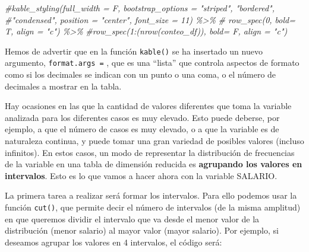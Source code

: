 \documentclass[
]{book}
\newenvironment{Shaded}{\begin{snugshade}}{\end{snugshade}}
\newcommand{\AttributeTok}[1]{\textcolor[rgb]{0.13,0.29,0.53}{#1}}
\newcommand{\CommentTok}[1]{\textcolor[rgb]{0.56,0.35,0.01}{\textit{#1}}}
\newcommand{\ConstantTok}[1]{\textcolor[rgb]{0.56,0.35,0.01}{#1}}
\newcommand{\DecValTok}[1]{\textcolor[rgb]{0.00,0.00,0.81}{#1}}
\newcommand{\FunctionTok}[1]{\textcolor[rgb]{0.13,0.29,0.53}{\textbf{#1}}}
\newcommand{\NormalTok}[1]{#1}
\newcommand{\OtherTok}[1]{\textcolor[rgb]{0.56,0.35,0.01}{#1}}
\newcommand{\SpecialCharTok}[1]{\textcolor[rgb]{0.81,0.36,0.00}{\textbf{#1}}}
\begin{document}
\begin{Shaded}
\begin{Highlighting}[]
  \CommentTok{\#kable\_styling(full\_width = F, bootstrap\_options = "striped", "bordered", \#"condensed", position = "center", font\_size = 11) \%\textgreater{}\%}
 \CommentTok{\# row\_spec(0, bold= T, align = "c") \%\textgreater{}\%}
  \CommentTok{\#row\_spec(1:(nrow(conteo\_df)), bold= F, align = "c")}
\end{Highlighting}
\end{Shaded}

Hemos de advertir que en la función \texttt{kable()} se ha insertado un nuevo argumento, \texttt{format.args\ =} , que es una ``lista'' que controla aspectos de formato como si los decimales se indican con un punto o una coma, o el número de decimales a mostrar en la tabla.

Hay ocasiones en las que la cantidad de valores diferentes que toma la variable analizada para los diferentes casos es muy elevado.
Esto puede deberse, por ejemplo, a que el número de casos es muy elevado, o a que la variable es de naturaleza continua, y puede tomar una gran variedad de posibles valores (incluso infinitos).
En estos casos, un modo de representar la distribución de frecuencias de la variable en una tabla de dimensión reducida es \textbf{agrupando los valores en intervalos}.
Esto es lo que vamos a hacer ahora con la variable SALARIO.

La primera tarea a realizar será formar los intervalos.
Para ello podemos usar la función \texttt{cut()}, que permite decir el número de intervalos (de la misma amplitud) en que queremos dividir el intervalo que va desde el menor valor de la distribución (menor salario) al mayor valor (mayor salario).
Por ejemplo, si deseamos agrupar los valores en 4 intervalos, el código será:

\begin{Shaded}
\end{Shaded}
\end{document}
